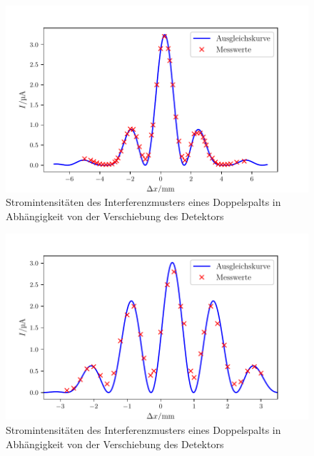 \begin{figure}
\centering
\includegraphics[width=\linewidth-70pt,height=\textheight-70pt,keepaspectratio]{content/images/Doppelspalt1.pdf}
\caption{Stromintensitäten des Interferenzmusters eines Doppelspalts in Abhängigkeit von der Verschiebung des Detektors}
\label{fig:Doppel1}
\end{figure}

\begin{figure}
\centering
\includegraphics[width=\linewidth-70pt,height=\textheight-70pt,keepaspectratio]{content/images/Doppelspalt2.pdf}
\caption{Stromintensitäten des Interferenzmusters eines Doppelspalts in Abhängigkeit von der Verschiebung des Detektors}
\label{fig:Doppel2}
\end{figure}